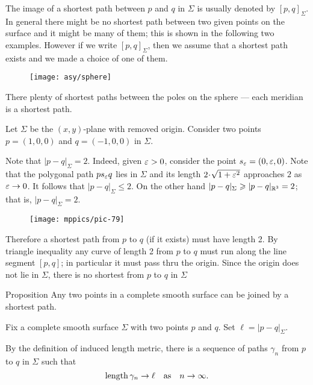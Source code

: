 The image of a shortest path between $p$ and $q$ in $\Sigma$ is usually denoted by $[p,q]_\Sigma$.
In general there might be no shortest path between two given points on the surface
and it might be many of them;
this is shown in the following two examples.
However if we write $[p,q]_\Sigma$, then we assume that a shortest path exists and we made a choice of one of them.

\begin{wrapfigure}{r}{28 mm}
\vskip-4mm
\centering
\texttt{[image: asy/sphere]}
\vskip-3mm
\end{wrapfigure}

 There plenty of shortest paths between the poles on the sphere --- each meridian is a shortest path.

 Let $\Sigma$ be the $(x,y)$-plane with removed origin.
Consider two points $p=(1,0,0)$ and $q=(-1,0,0)$ in $\Sigma$.

Note that $|p-q|_\Sigma=2$. 
Indeed, given $\eps\z>0$, consider the point $s_\varepsilon=(0,\varepsilon,0)$.
Note that the polygonal path $ps_\varepsilon q$ lies in $\Sigma$ and its length $2\cdot\sqrt{1+\eps^2}$ approaches $2$ as $\varepsilon\to0$.
It follows that $|p-q|_\Sigma\le 2$.
On the other hand $|p-q|_\Sigma\geqslant |p-q|_{\mathbb{R}^3}=2$; that is, $|p-q|_\Sigma= 2$.

\begin{wrapfigure}{r}{28 mm}
\vskip-0mm
\centering
\texttt{[image: mppics/pic-79]}
\vskip-0mm
\end{wrapfigure}

Therefore a shortest path from $p$ to $q$ (if it exists) must have length 2.
By triangle inequality any curve of length 2 from $p$ to $q$ must run along the line segment $[p,q]$;
in particular it must pass thru the origin.
Since the origin does not lie in $\Sigma$, there is no shortest from $p$ to $q$ in $\Sigma$ 

\begin{thm}{Proposition}
Any two points in a complete smooth surface can be joined by a shortest path. 
\end{thm}

Fix a complete smooth surface $\Sigma$ with two points $p$ and $q$.
Set $\ell=|p-q|_\Sigma$.

By the definition of induced length metric,
there is a sequence of paths $\gamma_n$ from $p$ to $q$ in $\Sigma$ such that
\[\mathop{\rm length}\nolimits\gamma_n\to \ell\quad\text{as}\quad n\to \infty.\]

